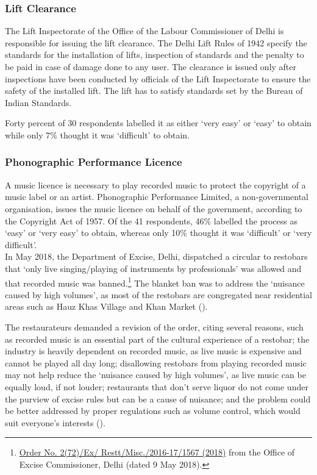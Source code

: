 \documentclass[a4paper, 12pt]{article}
\begin{document}
		\subsubsection{Lift Clearance}
		The Lift Inspectorate of the Office of the Labour Commissioner of Delhi is responsible for issuing the lift clearance. The Delhi Lift Rules of 1942 specify the standards for the installation of lifts, inspection of standards and the penalty to be paid in case of 
damage done to any user. The clearance is issued only after inspections have been conducted by officials of the Lift Inspectorate to ensure the safety of the installed lift. The lift has to satisfy standards set by the Bureau of Indian Standards.
		
		Forty percent of 30 respondents labelled it as either ‘very easy’ or ‘easy’ to obtain while only 7\% thought it was ‘difficult’ to obtain. %
		
		
		\subsubsection{Phonographic Performance Licence}
		A music licence is necessary to play recorded music to protect the copyright of a music label or an artist. Phonographic Performance Limited, a non-governmental organisation, issues the music licence on behalf of the government, according to the 
Copyright Act of 1957. Of the 41 respondents, 46\% labelled the process as ‘easy’ or ‘very easy’ to obtain, whereas only 10\% thought it was ‘difficult’ or ‘very difficult’.\\
		
		In May 2018, the Department of Excise, Delhi, dispatched a circular to restobars that ‘only live singing/playing of instruments by professionals’ was allowed and that recorded music was banned.\footnote{\href{https://bit.ly/2MzCM02} {Order No. 2(72)/Ex/
Restt/Misc./2016-17/1567 (2018)} from the Office of Excise Commissioner, Delhi (dated 9 May 2018).} The blanket ban was to address the ‘nuisance caused by high volumes’, as most of the restobars are congregated near residential areas such as Hauz Khas 
Village and Khan Market (\cite{week2018delhirecordedmusicban}).
		
		The restaurateurs demanded a revision of the order, citing several reasons, such as recorded music is an essential part of the cultural experience of a restobar; the industry is heavily dependent on recorded music, as live music is expensive and cannot 
be played all day long; disallowing restobars from playing recorded music may not help reduce the ‘nuisance caused by high volumes’, as live music can be equally loud, if not louder; restaurants that don’t serve liquor do not come under the purview of excise rules 
but can be a cause of nuisance; and the problem could be better addressed by proper regulations such as volume control, which would suit everyone’s interests (\cite{week2018delhirecordedmusicban}).
		
\end{document}
